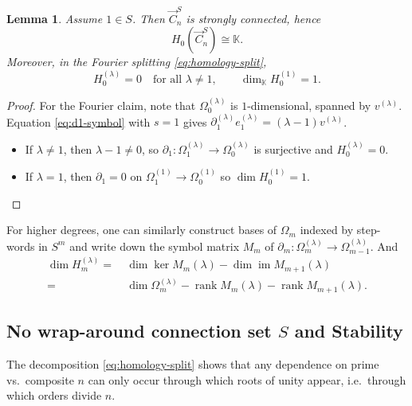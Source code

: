 \documentclass[11pt]{amsart}
\newcommand{\K}{\mathbb K}
\newcommand{\im}{\operatorname{im}}
\newcommand{\rank}{\operatorname{rank}}
\theoremstyle{plain}
\newtheorem{lemma}[theorem]{Lemma}
\theoremstyle{definition}
\numberwithin{equation}{section}
\begin{document}
\begin{lemma}
Assume $1\in S$. Then $\vec{C}_n^S$ is strongly connected, hence
\[
H_0(\vec{C}_n^S)\cong \K.
\]
Moreover, in the Fourier splitting \eqref{eq:homology-split},
\[
H_0^{(\lambda)}=0\quad\text{for all }\lambda\neq 1,
\qquad
\dim_\K H_0^{(1)}=1.
\]
\end{lemma}

\begin{proof}
For the Fourier claim, note that $\Omega_0^{(\lambda)}$ is $1$-dimensional, spanned by $v^{(\lambda)}$.
Equation \eqref{eq:d1-symbol} with $s=1$ gives $\partial _1^{(\lambda)}e_1^{(\lambda)}=(\lambda-1)v^{(\lambda)}$.
\begin{itemize}
    \item If $\lambda\neq 1$, then $\lambda-1\neq 0$, so $\partial_1:\Omega_1^{(\lambda)}\to \Omega_0^{(\lambda)}$ is surjective and
$H_0^{(\lambda)}=0$.
    \item  If $\lambda=1$, then $\partial_1=0$ on $\Omega_1^{(1)}\to \Omega_0^{(1)}$ so $\dim H_0^{(1)}=1$.
\end{itemize}
\end{proof}

For higher degrees, one can similarly construct bases of $\Omega_m$ indexed by step-words in $S^m$ and write down the symbol matrix $M_m$ of $\partial_m:\Omega_m^{(\lambda)}\rightarrow\Omega_{m-1}^{(\lambda)}$. And 
\begin{align*}
    \dim H_m^{(\lambda)}=~&\dim\ker M_m(\lambda)-\dim\im M_{m+1}(\lambda)\\
    =~&\dim \Omega_m^{(\lambda)}-\rank M_m(\lambda)-\rank M_{m+1}(\lambda).
\end{align*}



\subsection{No wrap-around connection set \texorpdfstring{$S$}{S} and Stability}
\label{sub:stability}



The decomposition \eqref{eq:homology-split} shows that any dependence on prime vs.\ composite $n$ can only occur through which roots of unity appear, i.e.\ through which orders divide $n$.
\end{document}
